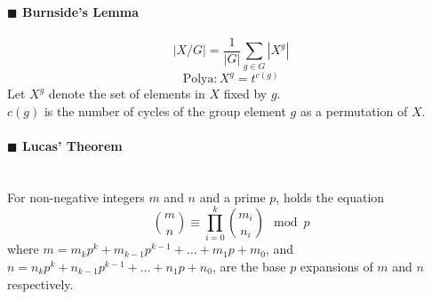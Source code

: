 ﻿\documentclass[10pt]{article}
\begin{document}
{\paragraph{$\blacksquare$ Burnside's Lemma}
\noindent
\begin{displaymath}
|X/G|=\frac{1}{|G|}\sum_{g\in G}|X^g|
\end{displaymath}
\begin{displaymath}
\mathrm{Polya}: X^g=t^{c(g)}
\end{displaymath}
Let $X^g$ denote the set of elements in $X$ fixed by $g$. \\
$c(g)$ is the number of cycles of the group element $g$ as a permutation of $X$.
\paragraph{$\blacksquare$ Lucas' Theorem}
\noindent \\
For non-negative integers $m$ and $n$ and a prime $p$, holds the equation \\
\begin{displaymath}
\binom{m}{n} \equiv \prod_{i=0}^k \binom{m_i}{n_i} \mod p
\end{displaymath}
where $m=m_kp^k+m_{k-1}p^{k-1}+\ldots +m_1p+m_0$, and $n=n_kp^k+n_{k-1}p^{k-1}+\ldots +n_1p+n_0$, are the base $p$ expansions of $m$ and $n$ respectively.
}
\end{document}
